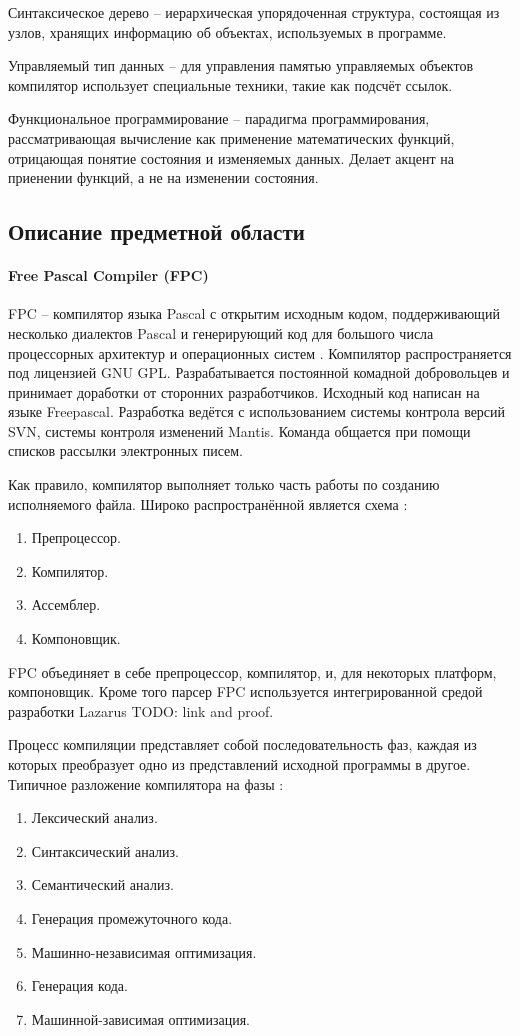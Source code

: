 \documentclass{imcs}
\begin{document}
Синтаксическое дерево -- иерархическая упорядоченная структура,
состоящая из узлов, хранящих информацию об объектах, используемых в
программе.

Управляемый тип данных -- для управления памятью управляемых объектов
компилятор использует специальные техники, такие как подсчёт ссылок\cite{delhpimanged}.

Функциональное программирование -- парадигма программирования,
рассматривающая вычисление как применение математических функций,
отрицающая понятие состояния и изменяемых данных. Делает акцент на
приенении функций, а не на изменении состояния.

\subsection{Описание предметной области}

\paragraph{Free Pascal Compiler (FPC)} FPC -- компилятор языка Pascal с открытим исходным
кодом, поддерживающий несколько диалектов Pascal и генерирующий код для большого
числа процессорных архитектур и операционных систем \cite{fpc}.
Компилятор распространяется под лицензией GNU GPL. Разрабатывается
постоянной комадной добровольцев и принимает доработки от сторонних разработчиков.
Исходный код написан на языке Freepascal. Разработка ведётся с использованием системы
контрола версий SVN, системы контроля изменений Mantis. Команда общается при
помощи списков рассылки электронных писем.

Как правило, компилятор выполняет только часть работы по созданию исполняемого файла.
Широко распространённой является схема \cite{dragonbook}:
\begin{enumerate}
    \item Препроцессор.
    \item Компилятор.
    \item Ассемблер.
    \item Компоновщик.
\end{enumerate}

FPC объединяет в себе препроцессор, компилятор, и, для некоторых платформ,
компоновщик. Кроме того парсер FPC используется интегрированной средой разработки
Lazarus \cite{lazarus} TODO: link and proof.

Процесс компиляции представляет собой последовательность фаз, каждая из которых
преобразует одно из представлений исходной программы в другое. Типичное разложение
компилятора на фазы \cite{dragonbook}:
\begin{enumerate}
    \item Лексический анализ.
    \item Синтаксический анализ.
    \item Семантический анализ.
    \item Генерация промежуточного кода.
    \item Машинно-независимая оптимизация.
    \item Генерация кода.
    \item Машинной-зависимая оптимизация.
\end{enumerate}
\end{document}
